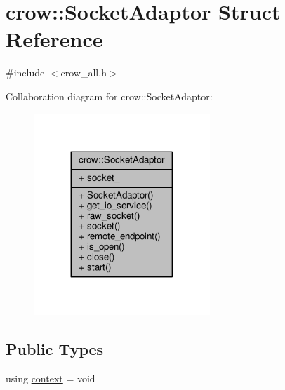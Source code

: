 \hypertarget{structcrow_1_1_socket_adaptor}{\section{crow\-:\-:Socket\-Adaptor Struct Reference}
\label{structcrow_1_1_socket_adaptor}
}


{\ttfamily \#include $<$crow\-\_\-all.\-h$>$}



Collaboration diagram for crow\-:\-:Socket\-Adaptor\-:
\nopagebreak
\begin{figure}[H]
\begin{center}
\leavevmode
\includegraphics[width=188pt]{structcrow_1_1_socket_adaptor__coll__graph}
\end{center}
\end{figure}
\subsection*{Public Types}
\begin{DoxyCompactItemize}
\item 
using \hyperlink{structcrow_1_1_socket_adaptor_aca8c861d9a672785e17e127042d2f721}{context} = void
\end{DoxyCompactItemize}
